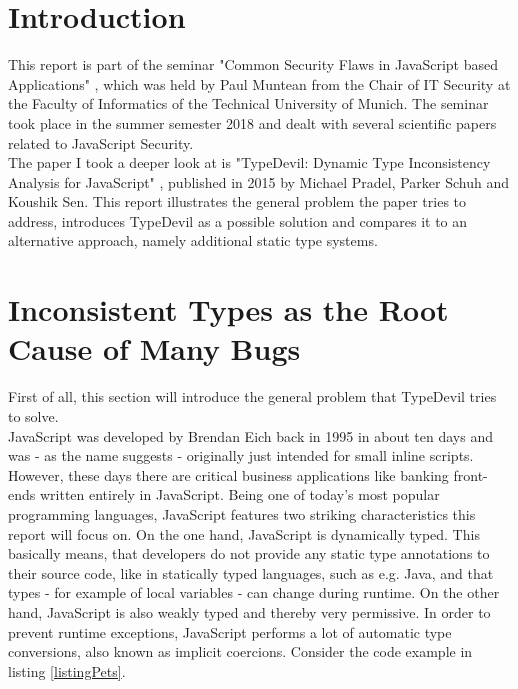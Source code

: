 \documentclass[runningheads,a4paper]{llncs}
\begin{document}
    \newpage

\setcounter{tocdepth}{2}
\tableofcontents
\newpage

\section{Introduction}

This report is part of the seminar "Common Security Flaws in JavaScript based Applications" \cite{CommonSecFlaws}, which was held by Paul Muntean from the Chair of IT Security at the Faculty of Informatics of the Technical University of Munich.
The seminar took place in the summer semester 2018 and dealt with several scientific papers related to JavaScript Security. \\
The paper I took a deeper look at is "TypeDevil: Dynamic Type Inconsistency Analysis for JavaScript" \cite{DBLP:conf/icse/PradelSS15}, published in 2015 by Michael Pradel, Parker Schuh and Koushik Sen.
This report illustrates the general problem the paper tries to address, introduces TypeDevil as a possible solution and compares it to an alternative approach, namely additional static type systems. 

\section{Inconsistent Types as the Root Cause of Many Bugs}
First of all, this section will introduce the general problem that TypeDevil tries to solve. \\
JavaScript was developed by Brendan Eich back in 1995 in about ten days and was - as the name suggests - originally just intended for small inline scripts.
However, these days there are critical business applications like banking front-ends written entirely in JavaScript. 
Being one of today's most popular programming languages, JavaScript features two striking characteristics this report will focus on. 
On the one hand, JavaScript is dynamically typed. 
This basically means, that developers do not provide any static type annotations to their source code, like in statically typed languages, such as e.g. Java, and that types - for example of local variables - can change during runtime.
On the other hand, JavaScript is also weakly typed and thereby very permissive. In order to prevent runtime exceptions, JavaScript performs a lot of automatic type conversions, also known as implicit coercions.
Consider the code example in listing \ref{listingPets}. 
\end{document}
